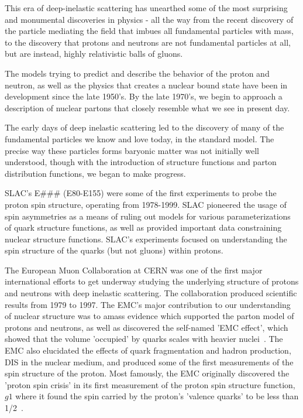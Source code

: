 This era of deep-inelastic scattering has unearthed some of the most surprising
and monumental discoveries in physics - all the way from the recent discovery of
the particle mediating the field that imbues all fundamental particles with
mass, to the discovery that protons and neutrons are not fundamental particles
at all, but are instead, highly relativistic balls of gluons.

The models trying to predict and describe the behavior of the proton and
neutron, as well as the physics that creates a nuclear bound state have been in
development since the late 1950's. By the late 1970's, we begin to approach a
description of nuclear partons that closely resemble what we see in present day.

The early days of deep inelastic scattering led to the discovery of many of the
fundamental particles we know and love today, in the standard model. The
precise way these particles forms baryonic matter was not initially well
understood, though with the introduction of structure functions and parton
distribution functions, we began to make progress.


SLAC's E\#\#\# (E80-E155) were some of the first experiments to probe the proton
spin structure, operating from 1978-1999. SLAC pioneered the usage of spin
asymmetries as a means of ruling out models for various parameterizations of
quark structure functions, as well as provided important data constraining
nuclear structure functions. SLAC's experiments focused on understanding the
spin structure of the quarks (but not gluons) within protons.

The European Muon Collaboration at CERN was one of the first major international
efforts to get underway studying the underlying structure of protons and
neutrons with deep inelastic scattering. The collaboration produced scientific
results from 1979 to 1997. The EMC's major contribution to our understanding of
nuclear structure was to amass evidence which supported the parton model of
protons and neutrons, as well as discovered the self-named 'EMC effect', which
showed that the volume 'occupied' by quarks scales with heavier
nuclei~\cite{Aubert1983}. The EMC also elucidated the effects of quark
fragmentation and hadron production, DIS in the nuclear medium, and produced
some of the first measurements of the spin structure of the proton. Most
famously, the EMC originally discovered the 'proton spin crisis' in its first
measurement of the proton spin structure function, $g1$ where it found the spin
carried by the proton's 'valence quarks' to be less than 1/2~\cite{Ashman1988}. 

